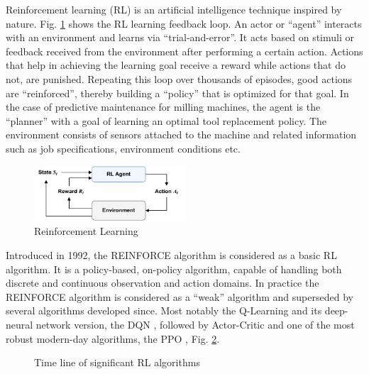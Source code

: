 \documentclass[a4paper, 12pt]{article}
\begin{document}
Reinforcement learning (RL) is an artificial intelligence technique inspired by nature. Fig. \ref{fig:RL-loop} \citep{barto2018} shows the RL learning feedback loop. An actor or ``agent'' interacts with an environment and learns via ``trial-and-error''. It acts based on stimuli or feedback received from the environment after performing a certain action. Actions that help in achieving the learning goal receive a reward while actions that do not, are punished. Repeating this loop over thousands of episodes, good actions are ``reinforced'', thereby building a ``policy'' that is optimized for that goal. In the case of predictive maintenance for milling machines, the agent is the ``planner'' with a goal of learning an optimal tool replacement policy. The environment consists of sensors attached to the machine and related information such as job specifications, environment conditions etc.

\begin{figure}[!h]
	\centering
	\includegraphics[width=0.5\textwidth]{RL-loop.pdf}
	\caption{Reinforcement Learning}
	\label{fig:RL-loop}
\end{figure}

Introduced in 1992, the REINFORCE algorithm \citep{REINFORCE-williams1992} is considered as a basic RL algorithm. It is a policy-based, on-policy algorithm, capable of handling both discrete and continuous observation and action domains. In practice the REINFORCE algorithm is considered as a ``weak'' algorithm and superseded by several algorithms developed since. Most notably the Q-Learning and its deep-neural network version, the DQN \citep{DQN-mnih2013}, followed by Actor-Critic \citep{A2C-mnih2016} and one of the most robust modern-day algorithms, the PPO \citep{PPO-schulman2017}, Fig. \ref{fig:TimeLine}.
\begin{figure}[htp]	
	\startchronology[startyear=1940, startdate=false, stopdate=false, arrow=false, color=codegray, height=.5ex]
	\stopchronology
	\vspace{-36pt}
	\caption{Time line of significant RL algorithms}
	\label{fig:TimeLine}
\end{figure}
\end{document}
